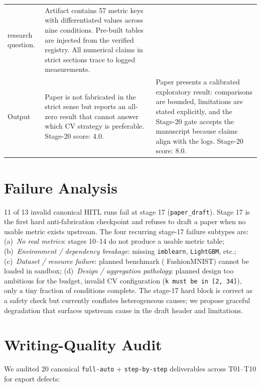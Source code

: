 \begin{table}[t]
\begin{tabular}{@{} l p{5.2cm} p{5.2cm} @{}}
  research question.
& Artifact contains 57 metric keys with differentiated values across
  nine conditions. Pre-built tables are injected from the verified
  registry. All numerical claims in strict sections trace to logged
  measurements. \\[3pt]
Output
& Paper is not fabricated in the strict sense but reports an all-zero
  result that cannot answer which CV strategy is preferable.
  Stage-20 score: 4.0.
& Paper presents a calibrated exploratory result: comparisons are bounded,
  limitations are stated explicitly, and the Stage-20 gate accepts the
  manuscript because claims align with the logs. Stage-20 score: 8.0. \\
\bottomrule
\end{tabular}
\end{table}


\section{Failure Analysis}
\label{app:failures}

11 of 13 invalid canonical HITL runs fail at stage 17 (\texttt{paper\_draft}).
Stage 17 is the first hard anti-fabrication checkpoint and refuses to draft a paper
when no usable metric exists upstream. The four recurring stage-17 failure subtypes
are: (a)~\emph{No real metrics}: stages 10--14 do not produce a usable metric
table; (b)~\emph{Environment / dependency breakage}: missing \texttt{imblearn},
\texttt{LightGBM}, etc.; (c)~\emph{Dataset / resource failure}: planned benchmark
(\eg{} FashionMNIST) cannot be loaded in sandbox; (d)~\emph{Design / aggregation
pathology}: planned design too ambitious for the budget, invalid CV configuration
(\texttt{k must be in [2, 34]}), only a tiny fraction of conditions complete. The
stage-17 hard block is correct as a safety check but currently conflates
heterogeneous causes; we propose graceful degradation that surfaces upstream cause
in the draft header and limitations.


\section{Writing-Quality Audit}
\label{app:writing-quality}

We audited 20 canonical \texttt{full-auto} + \texttt{step-by-step} deliverables
across T01--T10 for export defects:

